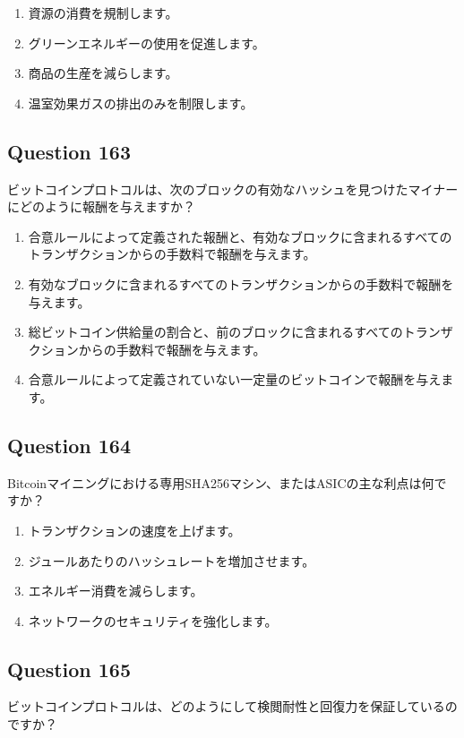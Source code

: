 \documentclass[12pt,a4paper]{article}
\begin{document}
\begin{enumerate}[label=\Alph*., leftmargin=*]
\item 資源の消費を規制します。
\item グリーンエネルギーの使用を促進します。
\item 商品の生産を減らします。
\item 温室効果ガスの排出のみを制限します。
\end{enumerate}

\bigskip


\subsection*{Question 163}
ビットコインプロトコルは、次のブロックの有効なハッシュを見つけたマイナーにどのように報酬を与えますか？

\begin{enumerate}[label=\Alph*., leftmargin=*]
\item 合意ルールによって定義された報酬と、有効なブロックに含まれるすべてのトランザクションからの手数料で報酬を与えます。
\item 有効なブロックに含まれるすべてのトランザクションからの手数料で報酬を与えます。
\item 総ビットコイン供給量の割合と、前のブロックに含まれるすべてのトランザクションからの手数料で報酬を与えます。
\item 合意ルールによって定義されていない一定量のビットコインで報酬を与えます。
\end{enumerate}

\bigskip


\subsection*{Question 164}
Bitcoinマイニングにおける専用SHA256マシン、またはASICの主な利点は何ですか？

\begin{enumerate}[label=\Alph*., leftmargin=*]
\item トランザクションの速度を上げます。
\item ジュールあたりのハッシュレートを増加させます。
\item エネルギー消費を減らします。
\item ネットワークのセキュリティを強化します。
\end{enumerate}

\bigskip


\subsection*{Question 165}
ビットコインプロトコルは、どのようにして検閲耐性と回復力を保証しているのですか？
\end{document}
